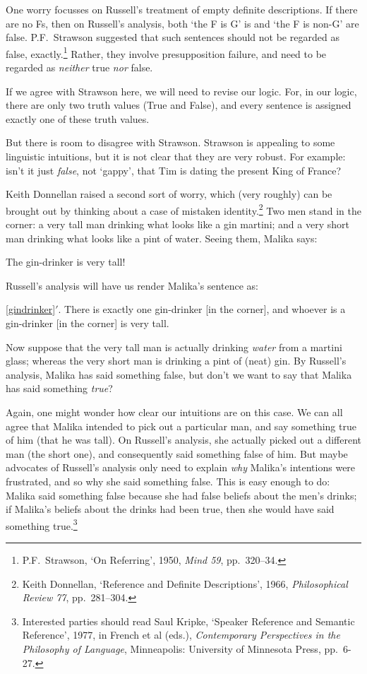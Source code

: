 One worry focusses on Russell's treatment of empty definite descriptions. If there are no Fs, then on Russell's analysis, both `the F is G' is and  `the F is non-G' are false. P.F.\ Strawson suggested that such sentences should not be regarded as false, exactly.\footnote{P.F.\ Strawson, `On Referring', 1950, \emph{Mind 59}, pp.\ 320--34.} Rather, they involve presupposition failure, and need to be regarded as \emph{neither} true \emph{nor} false. 

If we agree with Strawson here, we will need to revise our logic. For, in our logic, there are only two truth values (True and False), and every sentence is assigned exactly one of these truth values. 

But there is room to disagree with Strawson. Strawson is appealing to some linguistic intuitions, but it is not clear that they are very robust. For example: isn't it just \emph{false}, not `gappy', that Tim is dating the present King of France?

Keith Donnellan raised a second sort of worry, which (very roughly) can be brought out by thinking about a case of mistaken identity.\footnote{Keith Donnellan, `Reference and Definite Descriptions', 1966, \emph{Philosophical Review 77}, pp.\ 281--304.} Two men stand in the corner: a very tall man drinking what looks like a gin martini; and a very short man drinking what looks like a pint of water. Seeing them, Malika says:
	\begin{earg}
		\item[\ex{gindrinker}] The gin-drinker is very tall!
	\end{earg}
Russell's analysis will have us render Malika's sentence as:
	\begin{earg}
		\item[\ref{gindrinker}$'$.] There is exactly one gin-drinker [in the corner], and whoever is a gin-drinker [in the corner] is very tall.
	\end{earg}
Now suppose that the very tall man is actually drinking \emph{water} from a martini glass; whereas the very short man is drinking a pint of (neat) gin. By Russell's analysis, Malika has said something false, but don't we want to say that Malika has said something \emph{true}? 

Again, one might wonder how clear our intuitions are on this case. We can all agree that Malika intended to pick out a particular man, and say something true of him (that he was tall). On Russell's analysis, she actually picked out a different man (the short one), and consequently said something false of him. But  maybe advocates of Russell's analysis only need to explain \emph{why} Malika's intentions were frustrated, and so why she said something false. This is easy enough to do:  Malika said something false because she had false beliefs about the men's drinks; if Malika's beliefs about the drinks had been true,  then she would have said something true.\footnote{Interested parties should read Saul Kripke, `Speaker Reference and Semantic Reference', 1977, in French et al (eds.), \emph{Contemporary Perspectives in the Philosophy of Language}, Minneapolis: University of Minnesota Press, pp.\ 6-27.}

